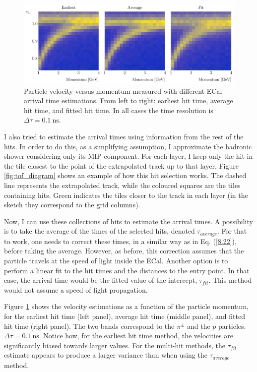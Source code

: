 \begin{figure}[t]
	\centering
	\includegraphics[width=.99\linewidth]{Images/GArSoft_PID/tof/beta_vs_momentum_comparison_delta_0.1.pdf}
	\caption{Particle velocity versus momentum measured with different ECal arrival time estimations. From left to right: earliest hit time, average hit time, and fitted hit time. In all cases the time resolution is $\Delta \tau = 0.1 ~ \mathrm{ns}$.}
	\label{fig:tof_beta_comp}
\end{figure}

I also tried to estimate the arrival times using information from the rest of the hits. In order to do this, as a simplifying assumption, I approximate the hadronic shower considering only its MIP component. For each layer, I keep only the hit in the tile closest to the point of the extrapolated track up to that layer. Figure \ref{fig:tof_diagram} shows an example of how this hit selection works. The dashed line represents the extrapolated track, while the coloured squares are the tiles containing hits. Green indicates the tiles closer to the track in each layer (in the sketch they correspond to the grid columns).

Now, I can use these collections of hits to estimate the arrival times. A possibility is to take the average of the times of the selected hits, denoted $\tau_{average}$. For that to work, one needs to correct these times, in a similar way as in Eq. (\ref{8.22}), before taking the average. However, as before, this correction assumes that the particle travels at the speed of light inside the ECal. Another option is to perform a linear fit to the hit times and the distances to the entry point. In that case, the arrival time would be the fitted value of the intercept, $\tau_{fit}$. This method would not assume a speed of light propagation.

Figure \ref{fig:tof_beta_comp} shows the velocity estimations as a function of the particle momentum, for the earliest hit time (left panel), average hit time (middle panel), and fitted hit time (right panel). The two bands correspond to the $\pi^{\pm}$ and the $p$ particles. $\Delta \tau = 0.1 ~ \mathrm{ns}$. Notice how, for the earliest hit time method, the velocities are significantly biased towards larger values. For the multi-hit methods, the $\tau_{fit}$ estimate appears to produce a larger variance than when using the $\tau_{average}$ method.

